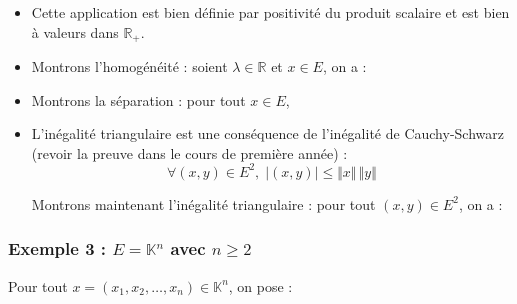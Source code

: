 \documentclass[french,11pt,twoside]{VcCours}
\begin{document}
\begin{itemize}
\item Cette application est bien définie par positivité du produit scalaire et est bien à valeurs dans $\mathbb{R}_+$.
\item Montrons l'homogénéité  : soient $\lambda \in \mathbb{R}$ et $x \in E$, on a :

\vspace{2cm}
\item Montrons la séparation : pour tout $x \in E$, 

\vspace{2cm}
\item L'inégalité triangulaire est une conséquence de l'inégalité de Cauchy-Schwarz (revoir la preuve dans le cours de première année) :
$$ \forall (x,y) \in E^2, \; \vert (x,y) \vert \leq \Vert x \Vert \, \Vert y \Vert$$
\newpage

Montrons maintenant l'inégalité triangulaire : pour tout $(x,y) \in E^2$, on a :
 
\vspace{6cm}


\end{itemize}

\subsubsection{Exemple 3 : \texorpdfstring{$E= \mathbb{K}^n$ avec $n \geq 2$}{E=IKⁿ avec n≥2}}

Pour tout $x=(x_1, x_2, \ldots, x_n) \in \mathbb{K}^n$, on pose :
\end{document}
